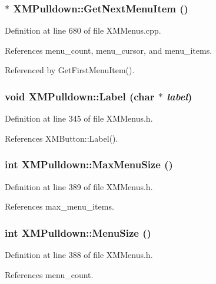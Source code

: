 \subsubsection{ $\ast$ XMPulldown::Get\-Next\-Menu\-Item ()}\label{classXMPulldown_a17}




Definition at line 680 of file XMMenus.cpp.

References menu\_\-count, menu\_\-cursor, and menu\_\-items.

Referenced by Get\-First\-Menu\-Item().
\subsubsection{\setlength{\rightskip}{0pt plus 5cm}void XMPulldown::Label (char $\ast$ {\em label})\hspace{0.3cm}{\tt  [inline]}}\label{classXMPulldown_a3}




Definition at line 345 of file XMMenus.h.

References XMButton::Label().
\subsubsection{\setlength{\rightskip}{0pt plus 5cm}int XMPulldown::Max\-Menu\-Size ()\hspace{0.3cm}{\tt  [inline]}}\label{classXMPulldown_a13}




Definition at line 389 of file XMMenus.h.

References max\_\-menu\_\-items.
\subsubsection{\setlength{\rightskip}{0pt plus 5cm}int XMPulldown::Menu\-Size ()\hspace{0.3cm}{\tt  [inline]}}\label{classXMPulldown_a12}




Definition at line 388 of file XMMenus.h.

References menu\_\-count.
